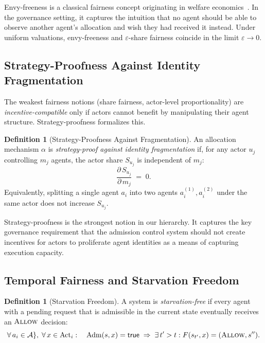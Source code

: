 \documentclass[11pt]{article}
\theoremstyle{plain}
\theoremstyle{definition}
\newtheorem{definition}[theorem]{Definition}
\theoremstyle{remark}
\newcommand{\Allow}{\textsc{Allow}}
\newcommand{\Adm}{\mathrm{Adm}}
\newcommand{\Agents}{\mathcal{Ag}}         %
\newcommand{\Share}[1]{S_{#1}}             %
\newcommand{\alloc}{\alpha}                %
\begin{document}
Envy-freeness is a classical fairness concept originating in
welfare economics~\citep{foley67}.  In the governance setting, it
captures the intuition that no agent should be able to observe another
agent's allocation and wish they had received it instead.  Under
uniform valuations, envy-freeness and $\varepsilon$-share fairness
coincide in the limit $\varepsilon \to 0$.

\subsection{Strategy-Proofness Against Identity Fragmentation}
\label{sec:strategy}

The weakest fairness notions (share fairness, actor-level
proportionality) are \emph{incentive-compatible} only if actors cannot
benefit by manipulating their agent structure.  Strategy-proofness
formalizes this.

\begin{definition}[Strategy-Proofness Against Fragmentation]
\label{def:strategy-proof}
An allocation mechanism $\alloc$ is \emph{strategy-proof against
identity fragmentation} if, for any actor $u_j$ controlling $m_j$
agents, the actor share $\Share{u_j}$ is independent of $m_j$:
\[
  \frac{\partial\, \Share{u_j}}{\partial\, m_j} \;=\; 0.
\]
Equivalently, splitting a single agent $a_i$ into two agents $a_i^{(1)},
a_i^{(2)}$ under the same actor does not increase $\Share{u_j}$.
\end{definition}

Strategy-proofness is the strongest notion in our hierarchy.  It
captures the key governance requirement that the admission control
system should not create incentives for actors to proliferate agent
identities as a means of capturing execution capacity.

\subsection{Temporal Fairness and Starvation Freedom}
\label{sec:temporal}

\begin{definition}[Starvation Freedom]
\label{def:starvation}
A system is \emph{starvation-free} if every agent with a pending
request that is admissible in the current state eventually receives
an $\Allow$ decision:
\[
  \forall\, a_i \in \Agents,\; \forall\, x \in \mathrm{Act}_i :
  \quad \Adm(s, x) = \mathsf{true}
  \;\Rightarrow\;
  \exists\, t' > t : F(s_{t'}, x) = (\Allow, s'').
\]
\end{definition}
\end{document}
